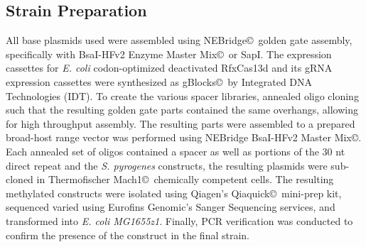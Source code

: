 \documentclass[times]{zHenriquesLab-StyleBioRxiv}
\begin{document}
\subsection{Strain Preparation}
All base plasmids used were assembled using NEBridge\copyright\ golden gate assembly, specifically with BsaI-HFv2 Enzyme Master Mix\copyright\ or SapI. The expression cassettes for {\it E. coli} codon-optimized deactivated RfxCas13d and its gRNA expression cassettes were synthesized as gBlocks\copyright\ by Integrated DNA Technologies (IDT). To create the various spacer libraries, annealed oligo cloning such that the resulting golden gate parts contained the same overhangs, allowing for high throughput assembly. The resulting parts were assembled to a prepared broad-host range vector was performed using NEBridge BsaI-HFv2 Master Mix\copyright . Each annealed set of oligos contained a spacer as well as portions of the 30 nt direct repeat and the {\it S. pyrogenes} constructs, the resulting plasmids were sub-cloned in Thermofischer Mach1\copyright\ chemically competent cells. The resulting methylated constructs were isolated using Qiagen's Qiaquick\copyright\ mini-prep kit, sequenced varied using Eurofins Genomic's Sanger Sequencing services, and transformed into {\it E. coli MG1655z1}. Finally, PCR verification was conducted to confirm the presence of the construct in the final strain. 
\end{document}
